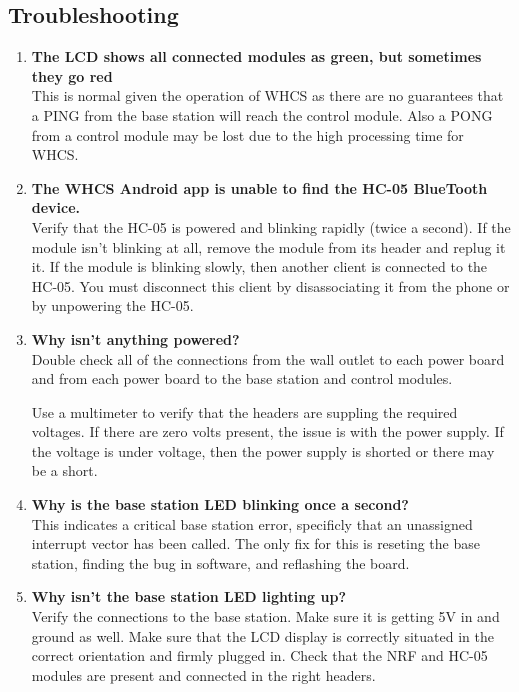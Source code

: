 \subsection{Troubleshooting}
\begin{enumerate}
\item \textbf{The LCD shows all connected modules as green, but sometimes they go red} \\
This is normal given the operation of WHCS as there are no guarantees that a PING
from the base station will reach the control module. Also a PONG from a control module
may be lost due to the high processing time for WHCS.

\item \textbf{The WHCS Android app is unable to find the HC-05 BlueTooth device.} \\
Verify that the HC-05 is powered and blinking rapidly (twice a second). If the module
isn't blinking at all, remove the module from its header and replug it it. If the module
is blinking slowly, then another client is connected to the HC-05. You must disconnect
this client by disassociating it from the phone or by unpowering the HC-05.

\item \textbf{Why isn't anything powered?} \\
Double check all of the connections from the
wall outlet to each power board and from each power board
to the base station and control modules.

Use a multimeter to verify that the headers are suppling the required
voltages. If there are zero volts present, the issue is with the power
supply. If the voltage is under voltage, then the power supply
is shorted or there may be a short.

\item \textbf{Why is the base station LED blinking once a second?} \\
This indicates a critical base station error, specificly that an unassigned
interrupt vector has been called. The only fix for this is reseting the
base station, finding the bug in software, and reflashing the board.

\item \textbf{Why isn't the base station LED lighting up?} \\
Verify the connections to the base station. Make sure it is getting
5V in and ground as well. Make sure that the LCD display is correctly
situated in the correct orientation and firmly plugged in. Check
that the NRF and HC-05 modules are present and connected in the right headers.


\end{enumerate}
